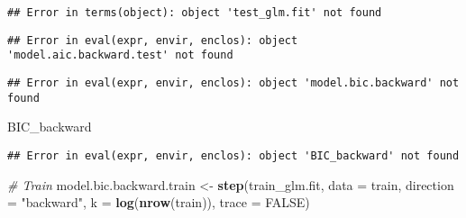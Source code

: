 \documentclass[]{article}
\newenvironment{Shaded}{\begin{snugshade}}{\end{snugshade}}
\newcommand{\CommentTok}[1]{\textcolor[rgb]{0.56,0.35,0.01}{\textit{#1}}}
\newcommand{\DataTypeTok}[1]{\textcolor[rgb]{0.13,0.29,0.53}{#1}}
\newcommand{\DecValTok}[1]{\textcolor[rgb]{0.00,0.00,0.81}{#1}}
\newcommand{\KeywordTok}[1]{\textcolor[rgb]{0.13,0.29,0.53}{\textbf{#1}}}
\newcommand{\NormalTok}[1]{#1}
\newcommand{\OperatorTok}[1]{\textcolor[rgb]{0.81,0.36,0.00}{\textbf{#1}}}
\newcommand{\OtherTok}[1]{\textcolor[rgb]{0.56,0.35,0.01}{#1}}
\newcommand{\StringTok}[1]{\textcolor[rgb]{0.31,0.60,0.02}{#1}}
\begin{document}
\begin{verbatim}
## Error in terms(object): object 'test_glm.fit' not found
\end{verbatim}

\begin{Shaded}
\end{Shaded}

\begin{verbatim}
## Error in eval(expr, envir, enclos): object 'model.aic.backward.test' not found
\end{verbatim}

\begin{Shaded}
\end{Shaded}

\begin{verbatim}
## Error in eval(expr, envir, enclos): object 'model.bic.backward' not found
\end{verbatim}

\begin{Shaded}
\begin{Highlighting}[]
\NormalTok{BIC_backward}
\end{Highlighting}
\end{Shaded}

\begin{verbatim}
## Error in eval(expr, envir, enclos): object 'BIC_backward' not found
\end{verbatim}

\begin{Shaded}
\begin{Highlighting}[]
\CommentTok{# Train}
\NormalTok{model.bic.backward.train <-}\StringTok{ }\KeywordTok{step}\NormalTok{(train_glm.fit, }\DataTypeTok{data =}\NormalTok{ train, }\DataTypeTok{direction =} \StringTok{"backward"}\NormalTok{, }\DataTypeTok{k =} \KeywordTok{log}\NormalTok{(}\KeywordTok{nrow}\NormalTok{(train)), }\DataTypeTok{trace =} \OtherTok{FALSE}\NormalTok{)}
\end{Highlighting}
\end{Shaded}
\end{document}
